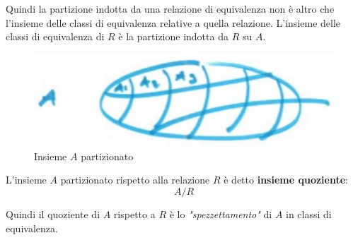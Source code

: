 \documentclass{article}
\begin{document}
Quindi la partizione indotta da una relazione di equivalenza non è altro che l'insieme
delle classi di equivalenza relative a quella relazione.
\newline
L'insieme delle classi di equivalenza di $R$ è la partizione indotta da $R$ su $A$.
\begin{figure}[H]
    \centering
    \includegraphics[scale=0.4]{images/rel_equi_graph.png}
    \caption{Insieme $A$ partizionato}
\end{figure}

L'insieme $A$ partizionato rispetto alla relazione $R$ è detto \textbf{insieme quoziente}:
$$A / R$$

Quindi il quoziente di $A$ rispetto a $R$ è lo \textit{"spezzettamento"} di $A$ in classi
di equivalenza.
\end{document}
